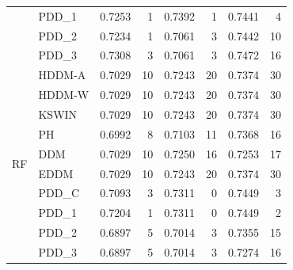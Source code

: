 \begin{table}[h]
{\begin{tabular}{llcrcrcr}
         & PDD\_1 & 0.7253 & 1 & 0.7392 & 1 & 0.7441 & 4 \\
         & PDD\_2 & 0.7234 & 1 & 0.7061 & 3 & 0.7442 & 10 \\
         & PDD\_3 & 0.7308 & 3 & 0.7061 & 3 & 0.7472 & 16 \\ \midrule
        \multirow{10}{*}{RF} & HDDM-A & 0.7029 & 10 & 0.7243 & 20 & 0.7374 & 30 \\
         & HDDM-W & 0.7029 & 10 & 0.7243 & 20 & 0.7374 & 30 \\
         & KSWIN & 0.7029 & 10 & 0.7243 & 20 & 0.7374 & 30 \\
         & PH & 0.6992 & 8 & 0.7103 & 11 & 0.7368 & 16 \\
         & DDM & 0.7029 & 10 & 0.7250 & 16 & 0.7253 & 17 \\
         & EDDM & 0.7029 & 10 & 0.7243 & 20 & 0.7374 & 30 \\
         & PDD\_C & 0.7093 & 3 & 0.7311 & 0 & 0.7449 & 3 \\
         & PDD\_1 & 0.7204 & 1 & 0.7311 & 0 & 0.7449 & 2 \\
         & PDD\_2 & 0.6897 & 5 & 0.7014 & 3 & 0.7355 & 15 \\
         & PDD\_3 & 0.6897 & 5 & 0.7014 & 3 & 0.7274 & 16 \\\bottomrule
    \end{tabular}}
\end{table}
